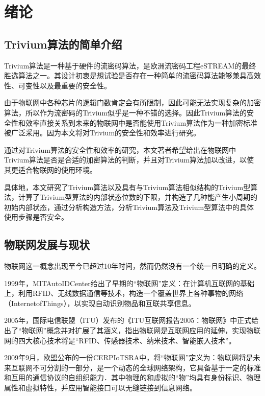 
\chapter{绪论}
\label{chap:introduction}

\section{Trivium算法的简单介绍}

Trivium算法是一种基于硬件的流密码算法，是欧洲流密码工程eSTREAM的最终胜选算法之一。其设计初衷是想试验是否存在一种简单的流密码算法能够兼具高效性、可变性以及最重要的安全性。

由于物联网中各种芯片的逻辑门数肯定会有所限制，因此可能无法实现复杂的加密算法，所以作为流密码的Trivium似乎是一种不错的选择。因此Trivium算法的安全性和效率直接关系到未来的物联网中是否能使用Trivium算法作为一种加密标准被广泛采用。因为本文将对Trivium的安全性和效率进行研究。

通过对Trivium算法的安全性和效率的研究，本文著者希望给出在物联网中Trivium算法是否是合适的加密算法的判断，并且对Trivium算法加以改进，以使其更适合物联网的使用环境。

具体地，本文研究了Trivium算法以及具有与Trivium算法相似结构的Trivium型算法，计算了Trivium型算法的内部状态位数的下限，并构造了几种能产生小周期的初始内部状态，通过分析构造方法，分析Trivium算法及Trivium型算法中的具体使用步骤是否安全。


\section{物联网发展与现状}

物联网这一概念出现至今已超过10年时间，然而仍然没有一个统一且明确的定义。

1999年，MITAutoIDCenter给出了早期的“物联网”定义：在计算机互联网的基础上，利用RFID、无线数据通信等技术，构造一个覆盖世界上各种事物的网络（InternetofThings），以实现自动识别物品和互联共享信息。

2005年，国际电信联盟（ITU）发布的《ITU互联网报告2005：物联网》中正式给出了“物联网”概念并对扩展了其涵义，指出物联网是互联网应用的延伸，实现物联网的四大核心技术将是“RFID、传感器技术、纳米技术、智能嵌入技术”。

2009年9月，欧盟公布的一份CERPIoTSRA中，将“物联网”定义为：物联网将是未来互联网不可分割的一部分，是一个动态的全球网络架构，它具备基于一定的标准和互用的通信协议的自组织能力．其中物理的和虚拟的“物”均具有身份标识、物理属性和虚拟特性，并应用智能接口可以无缝链接到信息网络。

